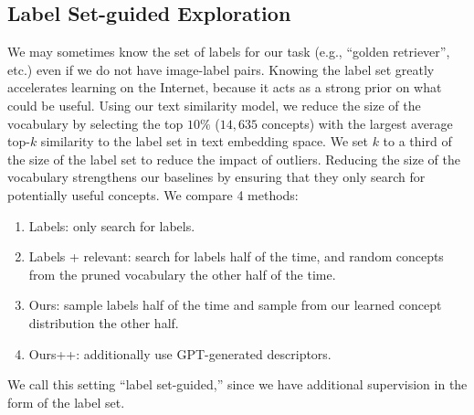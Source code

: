 \subsection{Label Set-guided Exploration}
We may sometimes know the set of labels for our task (e.g., ``golden retriever'', etc.) even if we do not have image-label pairs. 
Knowing the label set greatly accelerates learning on the Internet, because it acts as a strong prior on what could be useful. 
Using our text similarity model, we reduce the size of the vocabulary by selecting the top 
$10\%$ ($14{,}635$ concepts)
with the largest average top-$k$ similarity to the label set in text embedding space. We set $k$ to a third of the size of the label set to reduce the impact of outliers. Reducing the size of the vocabulary strengthens our baselines by ensuring that they only search for potentially useful concepts. We compare 4 methods:   
\begin{enumerate}[noitemsep,topsep=0pt]
    \item Labels: only search for labels. 
    \item Labels + relevant: search for labels  half of the time, and random concepts from the pruned vocabulary the other half of the time. 
    \item Ours: sample labels half of the time and sample from our learned concept distribution the other half. 
    \item Ours++: additionally use GPT-generated descriptors.
\end{enumerate}
We call this setting ``label set-guided,'' since we have additional supervision in the form of the label set.

